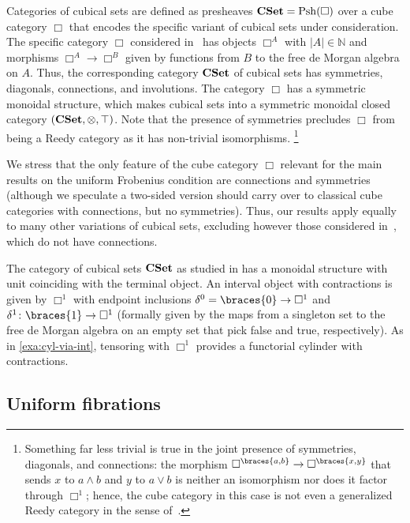 \documentclass[reqno,10pt,a4paper,oneside,draft]{amsart}
\begin{document}
\begin{example} \label{exa:cyl-in-cuset}
Categories of cubical sets are defined as presheaves $\mathbf{CSet} = \mathrm{Psh}(\Box)$ over a cube category $\Box$ that encodes the specific variant of cubical sets under consideration.
The specific category $\Box$ considered in~\cite{cohen-et-al:cubicaltt} has objects $\Box^A$ with $|A| \in \mathbb{N}$ and morphisms $\Box^A \to \Box^B$ given by functions from $B$ to the free de Morgan algebra on $A$.
Thus, the corresponding category $\mathbf{CSet}$ of cubical sets has symmetries, diagonals, connections, and involutions.
The category $\Box$ has a symmetric monoidal structure, which makes cubical sets into a symmetric monoidal closed category $(\mathbf{CSet}, \otimes, \top)$.
Note that the presence of symmetries precludes $\Box$ from being a Reedy category as it has non-trivial isomorphisms.%
\footnote{
Something far less trivial is true in the joint presence of symmetries, diagonals, and connections: the morphism $\Box^{\braces{a, b}} \to \Box^{\braces{x, y}}$ that sends $x$ to $a \wedge b$ and $y$ to $a \vee b$ is neither an isomorphism nor does it factor through $\Box^1$; hence, the cube category in this case is not even a generalized Reedy category in the sense of~\cite{berger-moerdijk:generalized-reedy}.
}

We stress that the only feature of the cube category $\Box$ relevant for the main results on the uniform Frobenius condition are connections and symmetries (although we speculate a two-sided version should carry over to classical cube categories with connections, but no symmetries).
Thus, our results apply equally to many other variations of cubical sets, excluding however those considered in~\cite{coquand-cubical-sets,huber-thesis}, which do not have connections.

The category of cubical sets $\mathbf{CSet}$ as studied in \cite{cohen-et-al:cubicaltt} has a monoidal structure with unit coinciding with the terminal object.
An interval object with contractions is given by $\Box^1$ with endpoint inclusions $\lcyl = \braces{0} \to \Box^1$ and $\rcyl \co \braces{1} \to \Box^1$ (formally given by the maps from a singleton set to the free de Morgan algebra on an empty set that pick false and true, respectively).
As in \cref{exa:cyl-via-int}, tensoring with $\Box^1$ provides a functorial cylinder with contractions.
\end{example}

\subsection*{Uniform fibrations}
\end{document}
